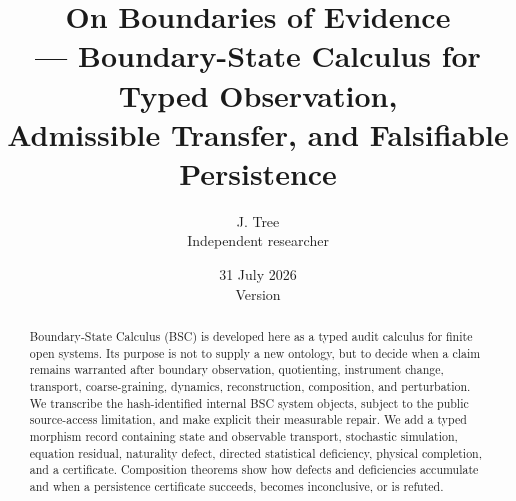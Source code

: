 \documentclass[11pt,a4paper]{article}
\title{\vspace{-1.3cm}\textbf{On Boundaries of Evidence}\\[0.3em]
\Large--- Boundary-State Calculus for Typed Observation,\\
Admissible Transfer, and Falsifiable Persistence}
\author{J. Tree\\[-0.15em]\small Independent researcher}
\date{31 July 2026\\[0.25em]\small Version \BSCVersion\quad\textbullet\quad
\BSCDOI}
\theoremstyle{definition}
\theoremstyle{plain}
\theoremstyle{remark}
\begin{document}
\maketitle
\vspace{-2.2em}

\begin{abstract}
Boundary-State Calculus (BSC) is developed here as a typed audit calculus for
finite open systems.  Its purpose is not to supply a new ontology, but to decide
when a claim remains warranted after boundary observation, quotienting,
instrument change, transport, coarse-graining, dynamics, reconstruction,
composition, and perturbation.  We transcribe the hash-identified internal BSC
system objects, subject to the public source-access limitation, and make
explicit their measurable repair.  We add a typed morphism record
containing state and observable transport, stochastic simulation, equation
residual, naturality defect, directed statistical deficiency, physical
completion, and a certificate.  Composition theorems show how defects and
deficiencies accumulate and when a persistence certificate succeeds, becomes
inconclusive, or is refuted.


\end{abstract}
\end{document}
